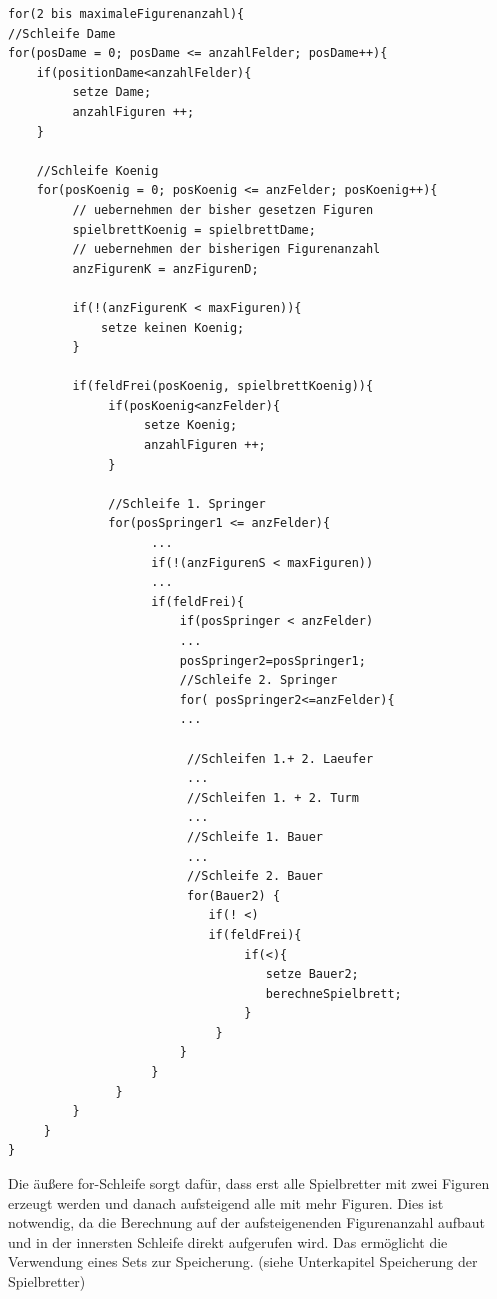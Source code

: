 \documentclass[
	12pt,
	a4paper,
	BCOR10mm,
	DIV14,
	listof=totoc,
	bibliography=totoc,
	headsepline
]{scrreprt}
\begin{document}
\begin{lstlisting}[caption={Erzeugung der Spielbretter}, label={lst:example1}]
for(2 bis maximaleFigurenanzahl){
//Schleife Dame
for(posDame = 0; posDame <= anzahlFelder; posDame++){	
	if(positionDame<anzahlFelder){
         setze Dame;
         anzahlFiguren ++;
    }
    
    //Schleife Koenig
    for(posKoenig = 0; posKoenig <= anzFelder; posKoenig++){	
    	 // uebernehmen der bisher gesetzen Figuren
         spielbrettKoenig = spielbrettDame;
         // uebernehmen der bisherigen Figurenanzahl
         anzFigurenK = anzFigurenD;
                    
         if(!(anzFigurenK < maxFiguren)){
             setze keinen Koenig;
         }
                                        
         if(feldFrei(posKoenig, spielbrettKoenig)){
              if(posKoenig<anzFelder){
                   setze Koenig;
                   anzahlFiguren ++;
              }
              
              //Schleife 1. Springer 	
              for(posSpringer1 <= anzFelder){
              		...
              		if(!(anzFigurenS < maxFiguren))
              		...
              		if(feldFrei){
              			if(posSpringer < anzFelder)
              			...
              			posSpringer2=posSpringer1;
              			//Schleife 2. Springer
              			for( posSpringer2<=anzFelder){
              			...
              			
              		 	 //Schleifen 1.+ 2. Laeufer
           			 	 ...
       				 	 //Schleifen 1. + 2. Turm
           			 	 ...
              		 	 //Schleife 1. Bauer
       				 	 ... 
              			 //Schleife 2. Bauer
              			 for(Bauer2) {
              				if(! <)
              				if(feldFrei){
              					 if(<){ 
              				 	 	setze Bauer2;
              				 	 	berechneSpielbrett;
              				 	 }
              				 }
              			}
              	 	}
               }
         }
     }
}
\end{lstlisting}

Die äußere for-Schleife sorgt dafür, dass erst alle Spielbretter mit zwei Figuren erzeugt werden und danach aufsteigend alle mit mehr Figuren. Dies ist notwendig, da die Berechnung auf der aufsteigenenden Figurenanzahl aufbaut und in der innersten Schleife direkt aufgerufen wird. Das ermöglicht die Verwendung eines Sets zur Speicherung. (siehe Unterkapitel Speicherung der Spielbretter)
 
\end{document}
